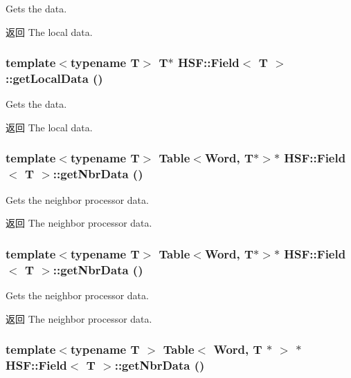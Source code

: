 Gets the data. \begin{DoxyReturn}{返回}
The local data. 
\end{DoxyReturn}
\hypertarget{classHSF_1_1Field_a737e777234950a28e98c42aebbdc8f32}{
\subsubsection[{getLocalData}]{\setlength{\rightskip}{0pt plus 5cm}template$<$typename T$>$ T$\ast$ {\bf HSF::Field}$<$ T $>$::getLocalData ()}}
\label{classHSF_1_1Field_a737e777234950a28e98c42aebbdc8f32}


Gets the data. \begin{DoxyReturn}{返回}
The local data. 
\end{DoxyReturn}
\hypertarget{classHSF_1_1Field_ab0af91c5a716e649d43e796d589bf69d}{
\subsubsection[{getNbrData}]{\setlength{\rightskip}{0pt plus 5cm}template$<$typename T$>$ Table$<$Word, T$\ast$$>$$\ast$ {\bf HSF::Field}$<$ T $>$::getNbrData ()}}
\label{classHSF_1_1Field_ab0af91c5a716e649d43e796d589bf69d}


Gets the neighbor processor data. \begin{DoxyReturn}{返回}
The neighbor processor data. 
\end{DoxyReturn}
\hypertarget{classHSF_1_1Field_ab0af91c5a716e649d43e796d589bf69d}{
\subsubsection[{getNbrData}]{\setlength{\rightskip}{0pt plus 5cm}template$<$typename T$>$ Table$<$Word, T$\ast$$>$$\ast$ {\bf HSF::Field}$<$ T $>$::getNbrData ()}}
\label{classHSF_1_1Field_ab0af91c5a716e649d43e796d589bf69d}


Gets the neighbor processor data. \begin{DoxyReturn}{返回}
The neighbor processor data. 
\end{DoxyReturn}
\hypertarget{classHSF_1_1Field_a5e2ff61fdd0a7b51b59d35564101e394}{
\subsubsection[{getNbrData}]{\setlength{\rightskip}{0pt plus 5cm}template$<$typename T $>$ Table$<$ Word, T $\ast$ $>$ $\ast$ {\bf HSF::Field}$<$ T $>$::getNbrData ()}}
\label{classHSF_1_1Field_a5e2ff61fdd0a7b51b59d35564101e394}


